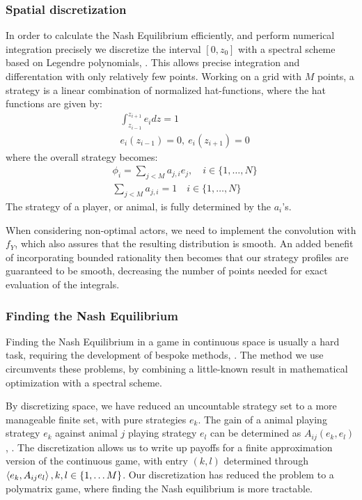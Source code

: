 \subsubsection{Spatial discretization}
In order to calculate the Nash Equilibrium efficiently, and perform numerical integration precisely we discretize the interval $[0,z_0]$ with a spectral scheme based on Legendre polynomials, \citep{kopriva2009implementing}. This allows precise integration and differentation with only relatively few points. Working on a grid with $M$ points, a strategy is a linear combination of normalized hat-functions, where the hat functions are given by:
\begin{align*}
	& \int_{z_{i-1}}^{z_{i+1}} e_i dz = 1 \\
	&e_i(z_{i-1}) = 0,~ e_i(z_{i+1}) = 0
\end{align*}
where the overall strategy becomes:
\begin{align*}
  &\phi_{i} = \sum_{j<M} a_{j,i} e_j, \quad i\in \{1,\dots, N\} \\
  &\sum_{j<M} a_{j,i} = 1 \quad i\in \{1,\dots, N\}
\end{align*}
The strategy of a player, or animal, is fully determined by the $a_i$'s.


When considering non-optimal actors, we need to implement the convolution with $f_Y$, which also assures that the resulting distribution is smooth. An added benefit of incorporating bounded rationality then becomes that our strategy profiles are guaranteed to be smooth, decreasing the number of points needed for exact evaluation of the integrals.


\subsubsection{Finding the Nash Equilibrium}
Finding the Nash Equilibrium in a game in continuous space is usually a hard task, requiring the development of bespoke methods, \citep{verticalmigration, jerome}. The method we use circumvents these problems, by combining a little-known result in mathematical optimization with a spectral scheme.

By discretizing space, we have reduced an uncountable strategy set to a more manageable finite set, with pure strategies $e_k$. The gain of a animal playing strategy $e_k$ against animal $j$ playing strategy $e_l$ can be determined as $A_{ij}(e_k,e_l)$, . The discretization allows us to write up payoffs for a finite approximation version of the continuous game,  with entry $(k,l)$ determined through $\left \langle e_k,A_{ij}e_l \right \rangle, k,l \in \{1,\dots M\}$.
Our discretization has reduced the problem to a polymatrix game, where finding the Nash equilibrium is more tractable.

